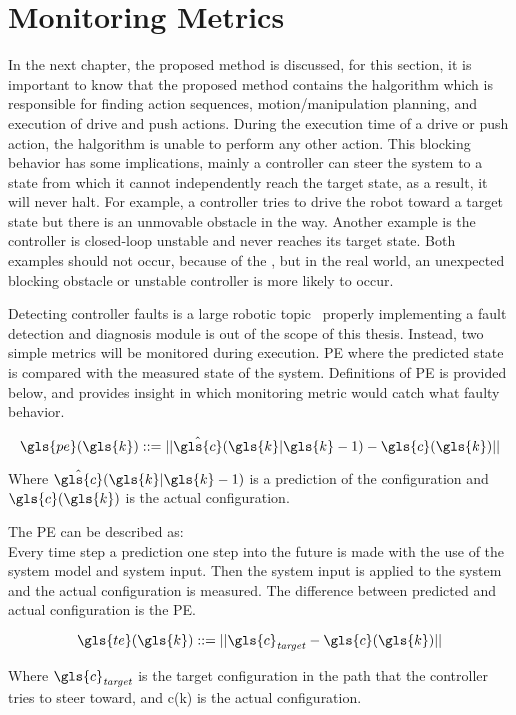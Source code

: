 \section{Monitoring Metrics}%
\label{sec:monitoring_metrics}
In the next chapter, the proposed method is discussed, for this section, it is important to know that the proposed method contains the \ac{halgorithm} which is responsible for finding action sequences, motion/manipulation planning, and execution of drive and push actions. During the execution time of a drive or push action, the \acl{halgorithm} is unable to perform any other action. This blocking behavior has some implications, mainly a controller can steer the system to a state from which it cannot independently reach the target state, as a result, it will never halt. For example, a controller tries to drive the robot toward a target state but there is an unmovable obstacle in the way. Another example is the controller is closed-loop unstable and never reaches its target state. Both examples should not occur, because of the , but in the real world, an unexpected blocking obstacle or unstable controller is more likely to occur.\bs

Detecting controller faults is a large robotic topic~\cite{khalastchi_fault_2019} properly implementing a fault detection and diagnosis module is out of the scope of this thesis. Instead, two simple metrics will be monitored during execution. \ac{PE} where the predicted state is compared with the measured state of the system. Definitions of \ac{PE} is provided below, and  provides insight in which monitoring metric would catch what faulty behavior.\bs

\[ \gls{pe}(\gls{k}) ::= ||\hat{\gls{c}}(\gls{k}|\gls{k}-1) - \gls{c}(\gls{k})|| \]

Where $\hat{\gls{c}}(\gls{k}|\gls{k}-1)$ is a prediction of the configuration and $\gls{c}(\gls{k})$ is the actual configuration.\bs

The \ac{PE} can be described as:\\
Every time step a prediction one step into the future is made with the use of the system model and system input. Then the system input is applied to the system and the actual configuration is measured. The difference between predicted and actual configuration is the \ac{PE}.

\[ \gls{te}(\gls{k}) ::= ||\gls{c}_\mathit{target} - \gls{c}(\gls{k})|| \]

Where $\gls{c}_\mathit{target}$ is the target configuration in the path that the controller tries to steer toward, and \gls{c}(\gls{k}) is the actual configuration.\bs

